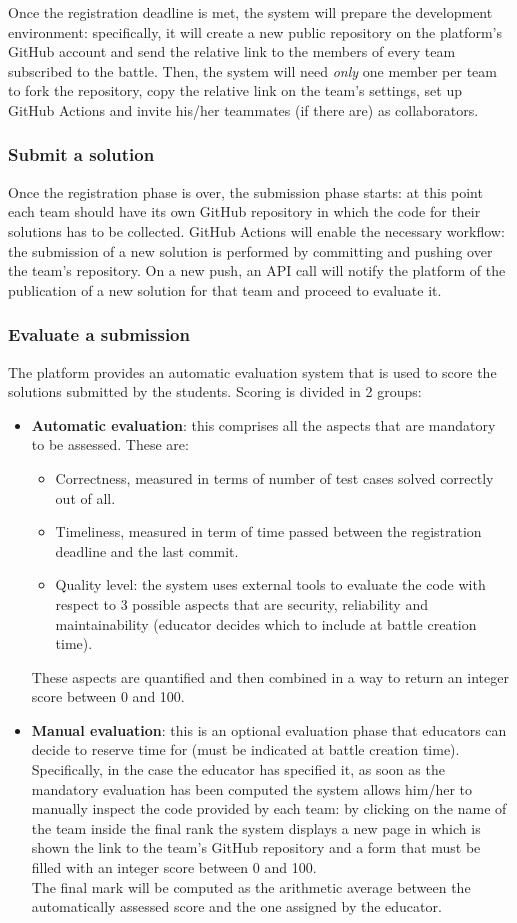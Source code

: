 Once the registration deadline is met, the system will prepare the development environment: specifically, it will create a new public repository on the platform's GitHub account and send the relative link to the members of every team subscribed to the battle. Then, the system will need \textit{only} one member per team to fork the repository, copy the relative link on the team's settings, set up GitHub Actions and invite his/her teammates (if there are) as collaborators.
\subsubsection{Submit a solution}
Once the registration phase is over, the submission phase starts: at this point each team should have its own GitHub repository in which the code for their solutions has to be collected. GitHub Actions will enable the necessary workflow: the submission of a new solution is performed by committing and pushing over the team's repository. On a new push, an API call will notify the platform of the publication of a new solution for that team and proceed to evaluate it.
\subsubsection{Evaluate a submission}
The platform provides an automatic evaluation system that is used to score the solutions submitted by the students. Scoring is divided in 2 groups:
\begin{itemize}
    \item \textbf{Automatic evaluation}: this comprises all the aspects that are mandatory to be assessed. These are:
    \begin{itemize}
        \item Correctness, measured in terms of number of test cases solved correctly out of all.
        \item Timeliness, measured in term of time passed between the registration deadline and the last commit.
        \item Quality level: the system uses external tools to evaluate the code with respect to 3 possible aspects that are security, reliability and maintainability (educator decides which to include at battle creation time).
    \end{itemize}
    These aspects are quantified and then combined in a way to return an integer score between 0 and 100.
    \item \textbf{Manual evaluation}: this is an optional evaluation phase that educators can decide to reserve time for (must be indicated at battle creation time). Specifically, in the case the educator has specified it, as soon as the mandatory evaluation has been computed the system allows him/her to manually inspect the code provided by each team: by clicking on the name of the team inside the final rank the system displays a new page in which is shown the link to the team’s GitHub repository and a form that must be filled with an integer score between 0 and 100.\\ The final mark will be computed as the arithmetic average between the automatically assessed score and the one assigned by the educator.
\end{itemize}
